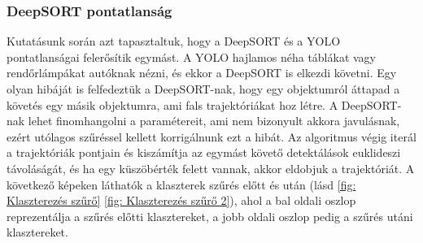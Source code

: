\documentclass[acmtog, authorversion]{acmart}
\begin{document}
\subsubsection{DeepSORT pontatlanság}
Kutatásunk során azt tapasztaltuk, hogy a DeepSORT és a YOLO pontatlanságai felerősítik egymást. A YOLO hajlamos néha táblákat
vagy rendőrlámpákat autóknak nézni, és ekkor a DeepSORT is elkezdi követni. Egy olyan hibáját is felfedeztük a DeepSORT-nak, hogy
egy objektumról áttapad a követés egy másik objektumra, ami fals trajektóriákat hoz létre. A DeepSORT-nak lehet finomhangolni a
paramétereit, ami nem bizonyult akkora javulásnak, ezért utólagos szűréssel kellett korrigálnunk ezt a hibát. Az algoritmus végig 
iterál a trajektóriák pontjain és kiszámítja az egymást követő detektálások euklideszi távoláságát, és ha egy küszöbérték felett vannak, akkor eldobjuk a trajektóriát.
A következő képeken láthatók a klaszterek szűrés előtt és után (lásd \ref{fig: Klaszterezés szűrő} \ref{fig: Klaszterezés szűrő 2}), ahol a bal oldali oszlop reprezentálja a szűrés előtti klasztereket, a jobb oldali oszlop pedig a szűrés utáni klasztereket.
\end{document}
